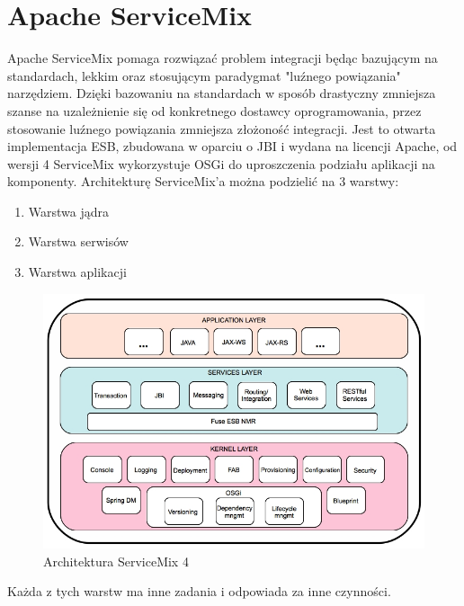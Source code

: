 \section{Apache ServiceMix}
Apache ServiceMix pomaga rozwiązać problem integracji będąc bazującym na standardach, lekkim oraz stosującym paradygmat "luźnego powiązania" narzędziem. Dzięki bazowaniu na standardach w sposób drastyczny zmniejsza szanse na uzależnienie się od konkretnego dostawcy oprogramowania, przez stosowanie luźnego powiązania zmniejsza złożoność integracji. Jest to otwarta implementacja ESB, zbudowana w oparciu o JBI i wydana na licencji Apache, od wersji 4 ServiceMix wykorzystuje OSGi do uproszczenia podziału aplikacji na komponenty. 	
Architekturę ServiceMix'a można podzielić na 3 warstwy:
\begin{enumerate}
	\item Warstwa jądra
	\item Warstwa serwisów
	\item Warstwa aplikacji
\end{enumerate}  
\begin{figure}[!h]
	\centering
	\includegraphics[scale=0.45]{ServiceMixArchitektura.jpg} 
	\caption{Architektura ServiceMix 4}
\end{figure}
Każda z tych warstw ma inne zadania i odpowiada za inne czynności.
